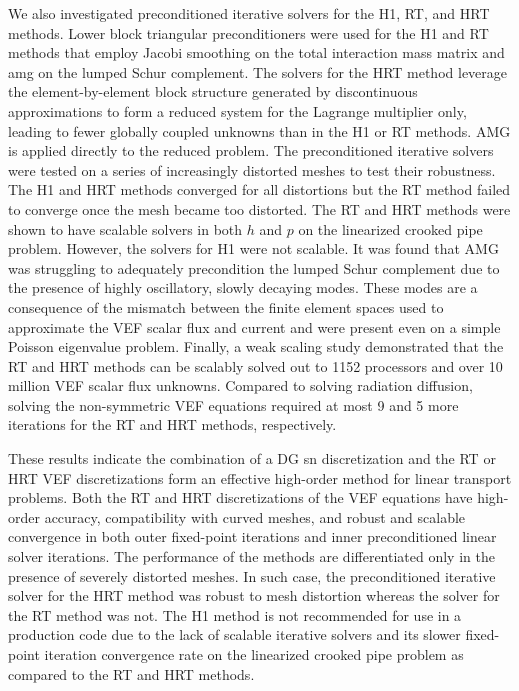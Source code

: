 \documentclass[../doc.tex]{subfiles}
\begin{document}
We also investigated preconditioned iterative solvers for the H1, RT, and HRT methods. Lower block triangular preconditioners were used for the H1 and RT methods that employ Jacobi smoothing on the total interaction mass matrix and \gls{amg} on the lumped Schur complement. The solvers for the HRT method leverage the element-by-element block structure generated by discontinuous approximations to form a reduced system for the Lagrange multiplier only, leading to fewer globally coupled unknowns than in the H1 or RT methods. AMG is applied directly to the reduced problem. The preconditioned iterative solvers were tested on a series of increasingly distorted meshes to test their robustness. The H1 and HRT methods converged for all distortions but the RT method failed to converge once the mesh became too distorted. The RT and HRT methods were shown to have scalable solvers in both $h$ and $p$ on the linearized crooked pipe problem. However, the solvers for H1 were not scalable. It was found that AMG was struggling to adequately precondition the lumped Schur complement due to the presence of highly oscillatory, slowly decaying modes. These modes are a consequence of the mismatch between the finite element spaces used to approximate the VEF scalar flux and current and were present even on a simple Poisson eigenvalue problem. Finally, a weak scaling study demonstrated that the RT and HRT methods can be scalably solved out to 1152 processors and over 10 million VEF scalar flux unknowns. Compared to solving radiation diffusion, solving the non-symmetric VEF equations required at most 9 and 5 more iterations for the RT and HRT methods, respectively.

These results indicate the combination of a DG \gls{sn} discretization and the RT or HRT VEF discretizations form an effective high-order method for linear transport problems. 
Both the RT and HRT discretizations of the VEF equations have high-order accuracy, compatibility with curved meshes, and robust and scalable convergence in both outer fixed-point iterations and inner preconditioned linear solver iterations. 
The performance of the methods are differentiated only in the presence of severely distorted meshes. In such case, the preconditioned iterative solver for the HRT method was robust to mesh distortion whereas the solver for the RT method was not. 
The H1 method is not recommended for use in a production code due to the lack of scalable iterative solvers and its slower fixed-point iteration convergence rate on the linearized crooked pipe problem as compared to the RT and HRT methods. 
\end{document}
